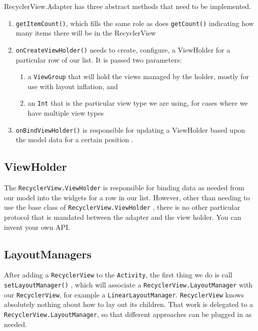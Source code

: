 RecyclerView.Adapter has three abstract methods that need to be implemented.

\begin{enumerate}
	\item \lstinline!getItemCount()!, which fills the same role as does \lstinline!getCount()! indicating how many items there will be in the RecyclerView
	\item \lstinline!onCreateViewHolder()!  needs to create, configure,
	a ViewHolder for a particular row of our list. It is passed two parameters:
	\begin{enumerate}
		\item a \lstinline!ViewGroup! that will hold the views managed by the holder, mostly for use
		with layout inflation, and
		\item an \lstinline!Int! that is the particular view type we are using, for cases where we have
		multiple view types
	\end{enumerate}
	\item \lstinline!onBindViewHolder()!
	is responsible for updating a ViewHolder based upon the
	model data for a certain position .
\end{enumerate}




\subsection{ViewHolder}
The \lstinline!RecyclerView.ViewHolder! is responsible for binding data as needed from our
model into the widgets for a row in our list. However, other than needing to use the base class of \lstinline!RecyclerView.ViewHolder! ,
there is no other particular protocol that is mandated between the adapter and the
view holder. You can invent your own API.




\subsection{LayoutManagers}
After adding a \lstinline!RecyclerView! to the \lstinline!Activity!, the first thing we do is call \lstinline!setLayoutManager()! ,
which will associate a \lstinline!RecyclerView.LayoutManager! with our \lstinline!RecyclerView!, for example a \lstinline!LinearLayoutManager!. \lstinline!RecyclerView!
knows absolutely nothing about how to lay out its children. That work is delegated
to a \lstinline!RecyclerView.LayoutManager!, so that different approaches can be plugged in as
needed.

